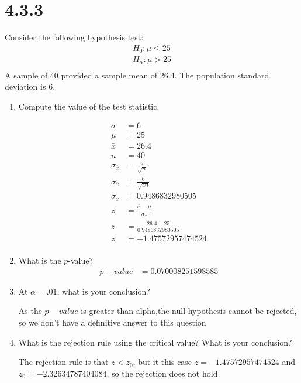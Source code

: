 \documentclass{article}
\begin{document}
\section*{4.3.3}
Consider the following hypothesis test:
\begin{align*}
  H_{0}: \mu \leq 25\\
  H_{\alpha}: \mu > 25\\
\end{align*}
A sample of 40 provided a sample mean of 26.4. The population standard deviation is 6.
\begin{enumerate}
  \item Compute the value of the test statistic.

  \begin{align*}
    \sigma &= 6\\
    \mu &= 25\\
    \bar{x} &= 26.4\\
    n &= 40\\
    \sigma_{\bar{x}} &= \frac{\sigma}{\sqrt{n}}\\
    \sigma_{\bar{x}} &= \frac{6}{\sqrt{40}}\\
    \sigma_{\bar{x}} &= 0.9486832980505\\
    z &= \frac{\bar{x} - \mu}{\sigma_{\bar{x}}}\\
    z &= \frac{26.4 - 25}{0.9486832980505}\\
    z &= -1.47572957474524\\
  \end{align*}

  \item What is the $p$-value?
  \begin{align}
    p-value &= 0.070008251598585
  \end{align}

  \item At $\alpha = .01$, what is your conclusion?

  As the $p-value$ is greater than alpha,the null hypothesis cannot be rejected, so we don't have a definitive answer to this question

  \item What is the rejection rule using the critical value? What is your conclusion?

  The rejection rule is that $z < z_{0}$, but it this case $z =-1.47572957474524$ and $z_{0} = -2.32634787404084$, so the rejection does not hold

\end{enumerate}
\end{document}
